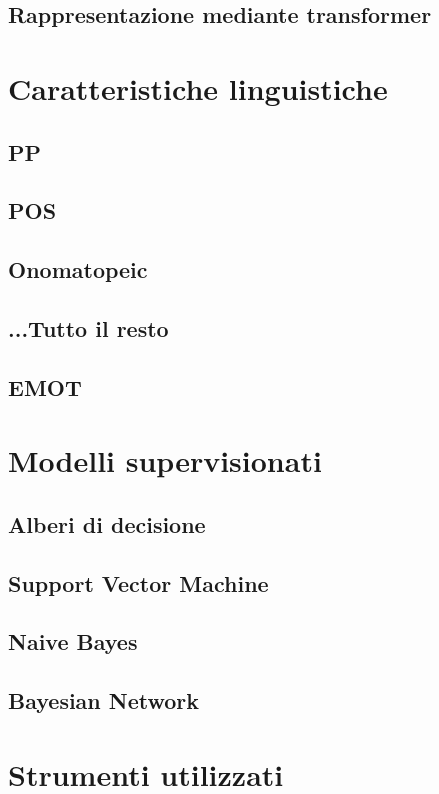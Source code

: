 \documentclass[oneside]{book}
\begin{document}
\subsection{Rappresentazione mediante transformer}

\section{Caratteristiche linguistiche}
\subsection{PP}
\subsection{POS}
\subsection{Onomatopeic}
\subsection{...Tutto il resto}
\subsection{EMOT}

\section{Modelli supervisionati}
\subsection{Alberi di decisione}
\subsection{Support Vector Machine}
\subsection{Naive Bayes}
\subsection{Bayesian Network}

\section{Strumenti utilizzati}
\end{document}
